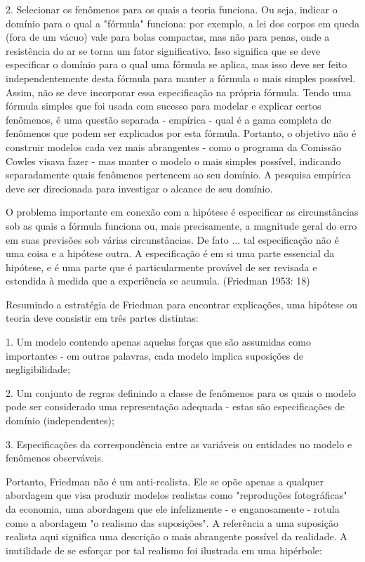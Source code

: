 \documentclass[12pt]{article}
\begin{document}
2. Selecionar os fenômenos para os quais a teoria funciona. Ou seja, indicar o domínio para o qual a "fórmula" funciona: por exemplo, a lei dos corpos em queda (fora de um vácuo) vale para bolas compactas, mas não para penas, onde a resistência do ar se torna um fator significativo. Isso significa que se deve especificar o domínio para o qual uma fórmula se aplica, mas isso deve ser feito independentemente desta fórmula para manter a fórmula o mais simples possível. Assim, não se deve incorporar essa especificação na própria fórmula. Tendo uma fórmula simples que foi usada com sucesso para modelar e explicar certos fenômenos, é uma questão separada - empírica - qual é a gama completa de fenômenos que podem ser explicados por esta fórmula. Portanto, o objetivo não é construir modelos cada vez mais abrangentes - como o programa da Comissão Cowles visava fazer - mas manter o modelo o mais simples possível, indicando separadamente quais fenômenos pertencem ao seu domínio. A pesquisa empírica deve ser direcionada para investigar o alcance de seu domínio.

O problema importante em conexão com a hipótese é especificar as circunstâncias sob as quais a fórmula funciona ou, mais precisamente, a magnitude geral do erro em suas previsões sob várias circunstâncias. De fato ... tal especificação não é uma coisa e a hipótese outra. A especificação é em si uma parte essencial da hipótese, e é uma parte que é particularmente provável de ser revisada e estendida à medida que a experiência se acumula.
(Friedman 1953: 18)

Resumindo a estratégia de Friedman para encontrar explicações, uma hipótese ou teoria deve consistir em três partes distintas:

1. Um modelo contendo apenas aquelas forças que são assumidas como importantes - em outras palavras, cada modelo implica suposições de negligibilidade;

2. Um conjunto de regras definindo a classe de fenômenos para os quais o modelo pode ser considerado uma representação adequada - estas são especificações de domínio (independentes);

3. Especificações da correspondência entre as variáveis ou entidades no modelo e fenômenos observáveis.

Portanto, Friedman não é um anti-realista. Ele se opõe apenas a qualquer abordagem que visa produzir modelos realistas como "reproduções fotográficas" da economia, uma abordagem que ele infelizmente - e enganosamente - rotula como a abordagem "o realismo das suposições". A referência a uma suposição realista aqui significa uma descrição o mais abrangente possível da realidade. A inutilidade de se esforçar por tal realismo foi ilustrada em uma hipérbole:
\end{document}

